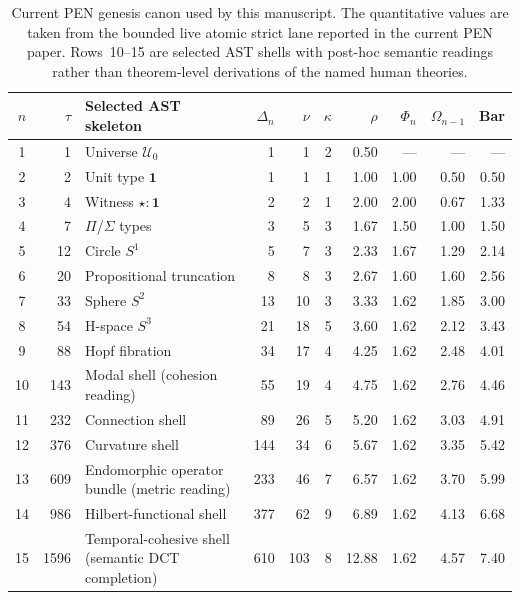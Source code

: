 \documentclass[11pt,a4paper]{article}
\theoremstyle{plain}
\theoremstyle{definition}
\theoremstyle{remark}
\newcommand{\U}{\mathcal{U}}
\begin{document}
\begin{table}[tbp]
\centering
\caption{Current PEN genesis canon used by this manuscript.
The quantitative values are taken from the bounded live atomic strict lane reported in the current PEN paper.
Rows~10--15 are selected AST shells with post-hoc semantic readings rather than theorem-level derivations of the named human theories.}
\label{tab:genesis}
\small
\setlength{\tabcolsep}{3pt}
\begin{tabular}{@{}cr l rrrr rrr@{}}
\toprule
$n$ & $\tau$ & Selected AST skeleton & $\Delta_n$ & $\nu$ & $\kappa$ & $\rho$ & $\Phi_n$ & $\Omega_{n-1}$ & Bar \\
\midrule
1  & 1    & Universe $\U_0$                                & 1   & 1   & 2 & 0.50  & ---  & ---  & ---  \\
2  & 2    & Unit type $\mathbf{1}$                         & 1   & 1   & 1 & 1.00  & 1.00 & 0.50 & 0.50 \\
3  & 4    & Witness $\star : \mathbf{1}$                   & 2   & 2   & 1 & 2.00  & 2.00 & 0.67 & 1.33 \\
4  & 7    & $\Pi$/$\Sigma$ types                           & 3   & 5   & 3 & 1.67  & 1.50 & 1.00 & 1.50 \\
\midrule
5  & 12   & Circle $S^1$                                   & 5   & 7   & 3 & 2.33  & 1.67 & 1.29 & 2.14 \\
6  & 20   & Propositional truncation                       & 8   & 8   & 3 & 2.67  & 1.60 & 1.60 & 2.56 \\
7  & 33   & Sphere $S^2$                                   & 13  & 10  & 3 & 3.33  & 1.62 & 1.85 & 3.00 \\
8  & 54   & H-space $S^3$                                  & 21  & 18  & 5 & 3.60  & 1.62 & 2.12 & 3.43 \\
9  & 88   & Hopf fibration                                 & 34  & 17  & 4 & 4.25  & 1.62 & 2.48 & 4.01 \\
\midrule
10 & 143  & Modal shell (cohesion reading)                 & 55  & 19  & 4 & 4.75  & 1.62 & 2.76 & 4.46 \\
11 & 232  & Connection shell                               & 89  & 26  & 5 & 5.20  & 1.62 & 3.03 & 4.91 \\
12 & 376  & Curvature shell                                & 144 & 34  & 6 & 5.67  & 1.62 & 3.35 & 5.42 \\
13 & 609  & Endomorphic operator bundle (metric reading)   & 233 & 46  & 7 & 6.57  & 1.62 & 3.70 & 5.99 \\
14 & 986  & Hilbert-functional shell                       & 377 & 62  & 9 & 6.89  & 1.62 & 4.13 & 6.68 \\
\midrule
15 & 1596 & Temporal-cohesive shell (semantic DCT completion) & 610 & 103 & 8 & 12.88 & 1.62 & 4.57 & 7.40 \\
\bottomrule
\end{tabular}
\end{table}
\end{document}
